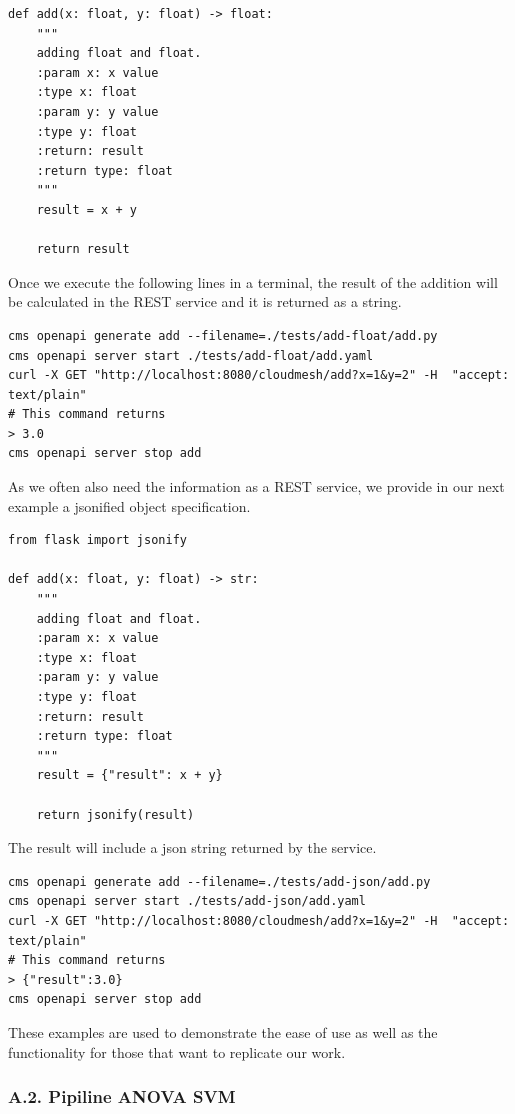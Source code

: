 \begin{verbatim}
def add(x: float, y: float) -> float:
    """
    adding float and float.
    :param x: x value
    :type x: float
    :param y: y value
    :type y: float
    :return: result
    :return type: float
    """
    result = x + y

    return result
\end{verbatim}

Once we execute the following lines in a terminal, the result of the
addition will be calculated in the REST service and it is returned as a
string.

\begin{verbatim}
cms openapi generate add --filename=./tests/add-float/add.py
cms openapi server start ./tests/add-float/add.yaml 
curl -X GET "http://localhost:8080/cloudmesh/add?x=1&y=2" -H  "accept: text/plain"
# This command returns
> 3.0
cms openapi server stop add
\end{verbatim}

As we often also need the information as a REST service, we provide in
our next example a jsonified object specification.

\begin{verbatim}
from flask import jsonify

def add(x: float, y: float) -> str:
    """
    adding float and float.
    :param x: x value
    :type x: float
    :param y: y value
    :type y: float
    :return: result
    :return type: float
    """
    result = {"result": x + y}

    return jsonify(result)
\end{verbatim}

The result will include a json string returned by the service.

\begin{verbatim}
cms openapi generate add --filename=./tests/add-json/add.py
cms openapi server start ./tests/add-json/add.yaml 
curl -X GET "http://localhost:8080/cloudmesh/add?x=1&y=2" -H  "accept: text/plain"
# This command returns
> {"result":3.0}
cms openapi server stop add
\end{verbatim}

These examples are used to demonstrate the ease of use as well as the
functionality for those that want to replicate our work.

\hypertarget{a.2.-pipiline-anova-svm}{%
\subsubsection{A.2. Pipiline ANOVA SVM}\label{a.2.-pipiline-anova-svm}}

